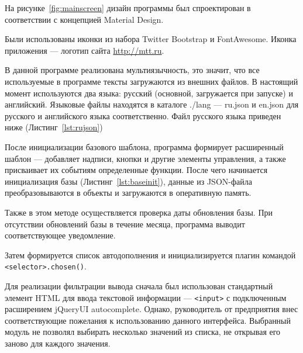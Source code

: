\begin{leftbar}
	На рисунке~\ref{fig:mainscreen} дизайн программы был спроектирован в соответствии с концепцией Material Design\cite{materialdesign}.
	
	Были использованы иконки из набора Twitter Bootstrap и FontAwesome. Иконка приложения --- логотип сайта \url{http://mtt.ru}.
\end{leftbar}



\begin{leftbar}
	В данной программе реализована мультиязычность, это значит, что все используемые в программе тексты загружаются из внешних файлов. В настоящий момент используются два языка: русский (основной, загружается при запуске) и английский. Языковые файлы находятся в каталоге ./lang --- ru.json и en.json для русского и английского языка соответственно. Файл русского языка приведен ниже (Листинг~\ref{lst:rujson})	
\end{leftbar}


После инициализации базового шаблона, программа формирует расширенный шаблон --- добавляет надписи, кнопки и другие элементы управления, а также присваивает их событиям определенные функции. После чего начинается инициализация базы (Листинг~\ref{lst:baseinit}), данные из JSON-файла преобразовываются в объекты и загружаются в оперативную память.

Также в этом методе осуществляется проверка даты обновления базы. При отсутствии обновлений базы в течение месяца, программа выводит соответствующее уведомление.


Затем формируется список автодополнения и инициализируется плагин командой \texttt{<selector>.chosen()}.


Для реализации фильтрации вывода сначала был использован стандартный элемент HTML для ввода текстовой информации --- \texttt{<input>} с подключенным расширением jQueryUI autocomplete\cite{jqueryui-autocomplete}. Однако, руководитель от предприятия внес соответствующие пожелания к использованию данного интерфейса. Выбранный модуль не позволял выбирать несколько значений из списка, не открывая его заново для каждого значения.

